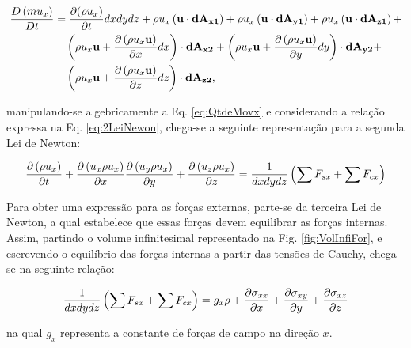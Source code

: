 \documentclass[tese_patricia]{subfiles}%
\begin{document}
 
 \begin{align}
 	\begin{split}
 		\frac{D \left(m u_{x}\right)}{D t} &= \frac{\partial (\rho u_{x})}{\partial t} dxdydz + \rho u_{x}\left(\mathbf{u} \cdot \mathbf{dA_{x1}}\right) +
 		\rho u_{x}\left(\mathbf{u} \cdot \mathbf{dA_{y1}}\right) + \rho u_{x}\left(\mathbf{u} \cdot \mathbf{dA_{z1}}\right) + \\&\quad
 		\left(\rho u_{x} \mathbf{u} + \frac{\partial \left(\rho u_{x} \mathbf{u}\right) }{\partial x}dx \right) \cdot \mathbf{dA_{x2}} + 
 		\left(\rho u_{x} \mathbf{u} + \frac{\partial \left(\rho u_{x} \mathbf{u}\right) }{\partial y}dy \right) \cdot \mathbf{dA_{y2}} + \\&\quad
 		\left(\rho u_{x} \mathbf{u} + \frac{\partial \left(\rho u_{x} \mathbf{u}\right) }{\partial z}dz \right) \cdot \mathbf{dA_{z2}},
 		 \label{eq:QtdeMovx} 
 	\end{split}
 \end{align}

\noindent manipulando-se algebricamente a  Eq. \ref{eq:QtdeMovx} e considerando a relação expressa na Eq. \ref{eq:2LeiNewon}, chega-se a seguinte representação para a segunda Lei de Newton:

\begin{align}
	\frac{\partial\left(\rho u_{x}\right)}{\partial t} + \frac{\partial\left(u_{x}\rho u_{x}\right)}{\partial x} 	\frac{\partial\left(u_{y}\rho u_{x}\right)}{\partial y} +\frac{\partial\left(u_{z}\rho u_{x}\right)}{\partial z} = \frac{1}{dxdydz}\left(\sum{F_{sx}} + \sum{F_{cx}}\right)	
\end{align}

Para obter uma expressão para as forças externas, parte-se da terceira Lei de Newton, a qual estabelece que essas forças devem equilibrar as forças internas. Assim, partindo o volume infinitesimal representado na Fig. \ref{fig:VolInfiFor}, e escrevendo o equilíbrio das forças internas a partir das tensões de Cauchy, chega-se na seguinte relação:


\begin{align}
	\frac{1}{dxdydz}\left(\sum{F_{sx}} + \sum{F_{cx}}\right) = g_x \rho + \frac{\partial \sigma_{xx}}{\partial x} + \frac{\partial \sigma_{xy}}{\partial y} + \frac{\partial \sigma_{xz}}{\partial z} 
\end{align}	

\noindent na qual $g_x$ representa a constante de forças de campo na direção $x$.
\end{document}

